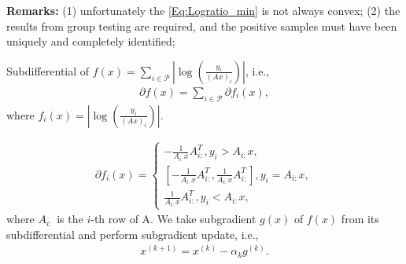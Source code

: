 \documentclass{article}
\theoremstyle{remark}
\begin{document}
{\bf Remarks:} (1) unfortunately the \eqref{Eq:Logratio_min} is not always convex; (2) the results from group testing are required, and the positive samples must have been uniquely and completely identified;

Subdifferential of $f(x)=\sum_{i\in \mathcal{P}} \left|\log\left(\frac{y_i}{(Ax)_i}\right)\right|$, i.e., 
\begin{align}
\partial f(x) =\sum_{i\in \mathcal{P}} \partial f_i(x),
\end{align}
where $f_i(x)=\left|\log\left(\frac{y_i}{(Ax)_i}\right)\right|$.


\begin{align}
    \partial f_i(x) = 
    \begin{cases}
    -\frac{1}{A_{i:}x} A_{i:}^T, y_i>A_{i:}x,\\
    [-\frac{1}{A_{i:}x} A_{i:}^T,\frac{1}{A_{i:}x} A_{i:}^T], y_i=A_{i:}x,\\
    \frac{1}{A_{i:}x} A_{i:}^T, y_i<A_{i:}x,
    \end{cases}
\end{align}
where $A_{i:}$ is the $i$-th row of A. We take subgradient $g(x)$ of $f(x)$ from its subdifferential and perform subgradient update, i.e., 
\begin{align}\label{Eq:SubgradientUpdate}
x^{(k+1)} = x^{(k)} - \alpha_k g^{(k)}.
\end{align}


\section{}









\end{document}
